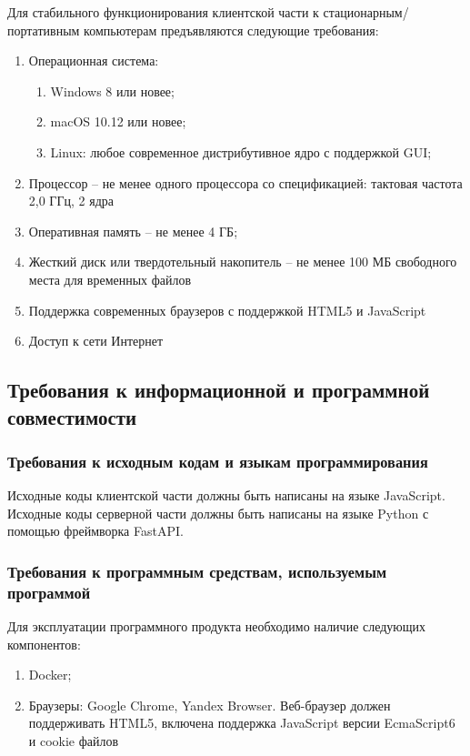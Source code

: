 \documentclass[a4paper,12pt,reqno]{article}
\begin{document}
    Для стабильного функционирования клиентской части к стационарным/портативным компьютерам предъявляются следующие требования:
    \begin{enumerate}
        \item Операционная система:
        \begin{enumerate}[label=\arabic{enumi}.\arabic*.]
            \item Windows 8 или новее;
            \item macOS 10.12 или новее;
            \item Linux: любое современное дистрибутивное ядро с поддержкой GUI;
        \end{enumerate}
        \item Процессор – не менее одного процессора со спецификацией: тактовая частота 2,0 ГГц, 2 ядра
        \item Оперативная память – не менее 4 ГБ;
        \item Жесткий диск или твердотельный накопитель – не менее 100 МБ свободного места для временных файлов
        \item Поддержка современных браузеров с поддержкой HTML5 и JavaScript
        \item Доступ к сети Интернет
    \end{enumerate}

    \subsection{Требования к информационной и программной совместимости}

    \subsubsection{Требования к исходным кодам и языкам программирования}
    Исходные коды клиентской части должны быть написаны на языке JavaScript.
    Исходные коды серверной части должны быть написаны на языке Python с помощью фреймворка FastAPI\cite{Framework:FastAPI}.

    \subsubsection{Требования к программным средствам, используемым программой}
    Для эксплуатации программного продукта необходимо наличие следующих компонентов:
    \begin{enumerate}
        \item Docker;
        \item Браузеры: Google Chrome, Yandex Browser. Веб-браузер должен поддерживать HTML5, включена поддержка JavaScript версии EcmaScript6 и cookie файлов
    \end{enumerate}
\end{document}
